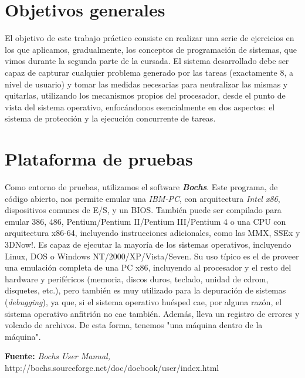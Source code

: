 \documentclass[a4paper]{article}
\begin{document}
\thispagestyle{empty}
\vspace{3cm}
\tableofcontents
\newpage


\newpage


\section{Objetivos generales}

El objetivo de este trabajo práctico consiste en realizar una serie de ejercicios en los que aplicamos, 
gradualmente, los conceptos de programación de sistemas, que vimos durante la segunda parte de la cursada. 
El sistema desarrollado debe ser capaz de capturar cualquier problema generado por las tareas (exactamente 8, a nivel de usuario) 
y tomar las medidas necesarias para neutralizar las mismas y quitarlas, utilizando los mecanismos propios
del procesador, desde el punto de vista del sistema operativo, enfocándonos esencialmente en dos aspectos:
el sistema de protección y la ejecución concurrente de tareas.


\section{Plataforma de pruebas}

Como entorno de pruebas, utilizamos el software \textit{\textbf{Bochs}}.
Este programa, de código abierto, nos permite emular una \textit{IBM-PC}, con arquitectura \textit{Intel x86}, dispositivos comunes de E/S, 
y un BIOS. También puede ser compilado para emular 386, 486, Pentium/Pentium II/Pentium III/Pentium 4 o una CPU con arquitectura x86-64, incluyendo instrucciones adicionales, como las MMX, SSEx y 3DNow!. Es capaz de ejecutar la mayoría de los sistemas operativos, incluyendo Linux, DOS o Windows NT/2000/XP/Vista/Seven. \newline
Su uso típico es el de proveer una emulación completa de una PC x86, incluyendo al procesador y el resto del hardware y periféricos (memoria, discos duros, teclado, unidad de cdrom, disquetes, etc.), pero también es muy utilizado para la depuración de sistemas (\textit{debugging}), ya que, si el sistema operativo huésped cae, por alguna razón, el sistema operativo anfitrión no cae también. Además, lleva un registro de errores y volcado de archivos. De esta forma, tenemos "una máquina dentro de la máquina". \newline

\noindent \textbf{Fuente:} \textit{Bochs User Manual,} http://bochs.sourceforge.net/doc/docbook/user/index.html
\end{document}
